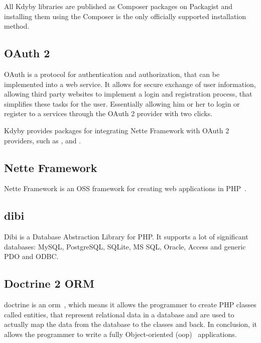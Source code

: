 All Kdyby libraries are published as Composer packages on Packagist and installing them using the Composer is the only officially supported installation method.

\subsection{OAuth 2} \label{sec:theory:oauth2}

OAuth is a protocol for authentication and authorization, that can be implemented into a web service. It allows for secure exchange of user information, allowing third party websites to implement a login and registration process, that simplifies these tasks for the user. Essentially allowing him or her to login or register to a services through the OAuth 2 provider with two clicks.

Kdyby provides packages for integrating Nette Framework with OAuth 2 providers, such as ,  and .

\subsection{Nette Framework} \label{sec:theory:nette}

Nette Framework is an OSS framework for creating web applications in PHP~\cite{wiki:nette}.

\subsection{dibi} \label{sec:theory:dibi}

Dibi is a Database Abstraction Library for PHP. It supports a lot of significant databases: MySQL, PostgreSQL, SQLite, MS SQL, Oracle, Access and generic PDO and ODBC.~\cite{dibi:homepage}

\subsection{Doctrine 2 ORM} \label{sec:theory:doctrine}

\gls{doctrine} is an \gls{orm}~\cite{wiki:orm}, which means it allows the programmer to create PHP classes called entities, that represent relational data in a database and are used to actually map the data from the database to the classes and back. In conclusion, it allows the programmer to write a fully Object-oriented (\acrshort{oop})~\cite{wiki:oop} applications.

